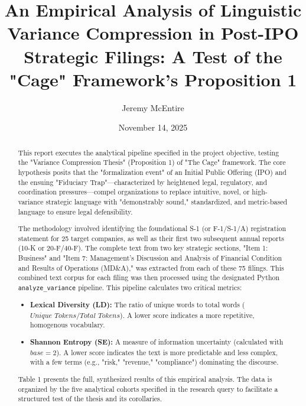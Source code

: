 \documentclass[12pt, letterpaper]{article}
\title{An Empirical Analysis of Linguistic Variance Compression in Post-IPO Strategic Filings: A Test of the "Cage" Framework's Proposition 1}
\author{Jeremy McEntire} %
\date{November 14, 2025}
\begin{document}
\maketitle

\begin{abstract}
This report executes the analytical pipeline specified in the project objective, testing the "Variance Compression Thesis" (Proposition 1) of "The Cage" framework. The core hypothesis posits that the "formalization event" of an Initial Public Offering (IPO) and the ensuing "Fiduciary Trap"—characterized by heightened legal, regulatory, and coordination pressures—compel organizations to replace intuitive, novel, or high-variance strategic language with "demonstrably sound," standardized, and metric-based language to ensure legal defensibility.

The methodology involved identifying the foundational S-1 (or F-1/S-1/A) registration statement for 25 target companies, as well as their first two subsequent annual reports (10-K or 20-F/40-F). The complete text from two key strategic sections, "Item 1: Business" and "Item 7: Management's Discussion and Analysis of Financial Condition and Results of Operations (MD\&A)," was extracted from each of these 75 filings. This combined text corpus for each filing was then processed using the designated Python \texttt{analyze\_variance} pipeline. This pipeline calculates two critical metrics:
\begin{itemize}
    \item \textbf{Lexical Diversity (LD):} The ratio of unique words to total words ($\textit{Unique Tokens} / \textit{Total Tokens}$). A lower score indicates a more repetitive, homogenous vocabulary.
    \item \textbf{Shannon Entropy (SE):} A measure of information uncertainty (calculated with $base=2$). A lower score indicates the text is more predictable and less complex, with a few terms (e.g., "risk," "revenue," "compliance") dominating the discourse.
\end{itemize}
Table 1 presents the full, synthesized results of this empirical analysis. The data is organized by the five analytical cohorts specified in the research query to facilitate a structured test of the thesis and its corollaries.
\end{abstract}

\clearpage
\end{document}
